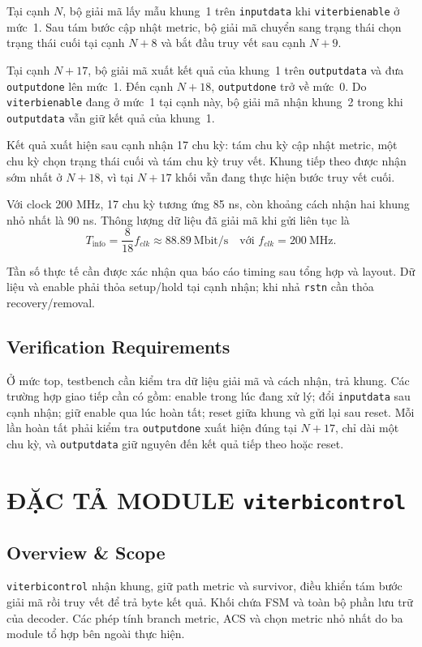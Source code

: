 \documentclass[12pt,a4paper]{article}
\DeclareRobustCommand{\code}[1]{\texttt{#1}}
\renewcommand{\_}{\originalunderscore\allowbreak}
\begin{document}
Tại cạnh $N$, bộ giải mã lấy mẫu khung~1 trên \texttt{input\_data}
khi \texttt{viterbi\_enable} ở mức~1. Sau tám bước cập nhật metric,
bộ giải mã chuyển sang trạng thái chọn trạng thái cuối tại cạnh $N+8$
và bắt đầu truy vết sau cạnh $N+9$.

Tại cạnh $N+17$, bộ giải mã xuất kết quả của khung~1 trên
\texttt{output\_data} và đưa \texttt{output\_done} lên mức~1.
Đến cạnh $N+18$, \texttt{output\_done} trở về mức~0. Do
\texttt{viterbi\_enable} đang ở mức~1 tại cạnh này, bộ giải mã
nhận khung~2 trong khi \texttt{output\_data} vẫn giữ kết quả của
khung~1.

Kết quả xuất hiện sau cạnh nhận 17 chu kỳ: tám chu kỳ cập nhật metric, một chu kỳ chọn trạng thái cuối và tám chu kỳ truy vết. Khung tiếp theo được nhận sớm nhất ở $N+18$, vì tại $N+17$ khối vẫn đang thực hiện bước truy vết cuối.

Với clock 200 MHz, 17 chu kỳ tương ứng 85 ns, còn khoảng cách nhận hai khung nhỏ nhất là 90 ns. Thông lượng dữ liệu đã giải mã khi gửi liên tục là
\begin{equation}
T_{\mathrm{info}}=\frac{8}{18}f_{clk}\approx88.89\ \mathrm{Mbit/s}
\quad\text{với } f_{clk}=200\ \mathrm{MHz}.
\end{equation}
\begin{samepage}
Tần số thực tế cần được xác nhận qua báo cáo timing sau tổng hợp và layout. Dữ liệu và enable phải thỏa setup/hold tại cạnh nhận; khi nhả \code{rstn} cần thỏa recovery/removal.

\subsection{Verification Requirements}
Ở mức top, testbench cần kiểm tra dữ liệu giải mã và cách nhận, trả khung. Các trường hợp giao tiếp cần có gồm: enable trong lúc đang xử lý; đổi \code{input\_data} sau cạnh nhận; giữ enable qua lúc hoàn tất; reset giữa khung và gửi lại sau reset. Mỗi lần hoàn tất phải kiểm tra \code{output\_done} xuất hiện đúng tại $N+17$, chỉ dài một chu kỳ, và \code{output\_data} giữ nguyên đến kết quả tiếp theo hoặc reset.



\end{samepage}

\clearpage
\section{ĐẶC TẢ MODULE \code{viterbi\_control}}\label{sec:controller}
\subsection{Overview \& Scope}
\code{viterbi\_control} nhận khung, giữ path metric và survivor, điều khiển tám bước giải mã rồi truy vết để trả byte kết quả. Khối chứa FSM và toàn bộ phần lưu trữ của decoder. Các phép tính branch metric, ACS và chọn metric nhỏ nhất do ba module tổ hợp bên ngoài thực hiện.
\end{document}
